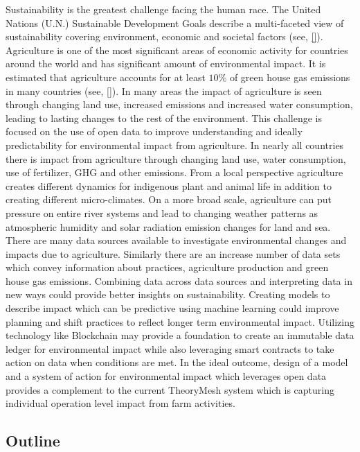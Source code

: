 \documentclass[11pt]{article}
\numberwithin{equation}{section}
\numberwithin{figure}{section}
\begin{document}
Sustainability is the greatest challenge facing the human race. The United Nations (U.N.) Sustainable Development Goals describe a multi-faceted view of sustainability covering environment, economic and societal factors (see, \ref{}).
Agriculture is one of the most significant areas of economic activity for countries around the world and has significant amount of environmental impact. It is estimated that agriculture accounts for at least $10\%$ of green house gas emissions in many countries (see, \ref{}). In many areas the impact of agriculture is seen through changing land use, increased emissions and increased water consumption, leading to lasting changes to the rest of the environment.
This challenge is focused on the use of open data to improve understanding and ideally predictability for environmental impact from agriculture. In nearly all countries there is impact from agriculture through changing land use, water consumption, use of fertilizer, GHG and other emissions. From a local perspective agriculture creates different dynamics for indigenous plant and animal life in addition to creating different micro-climates. On a more broad scale, agriculture can put pressure on entire river systems and lead to changing weather patterns as atmospheric humidity and solar radiation emission changes for land and sea.
There are many data sources available to investigate environmental changes and impacts due to agriculture. Similarly there are an increase number of data sets which convey information about practices, agriculture production and green house gas emissions. Combining data across data sources and interpreting data in new ways could provide better insights on sustainability. Creating models to describe impact which can be predictive using machine learning could improve planning and shift practices to reflect longer term environmental impact. Utilizing technology like Blockchain may provide a foundation to create an immutable data ledger for environmental impact while also leveraging smart contracts to take action on data when conditions are met.
In the ideal outcome, design of a model and a system of action for environmental impact which leverages open data provides a complement to the current TheoryMesh system which is capturing individual operation level impact from farm activities.

\subsection*{Outline}
\end{document}
